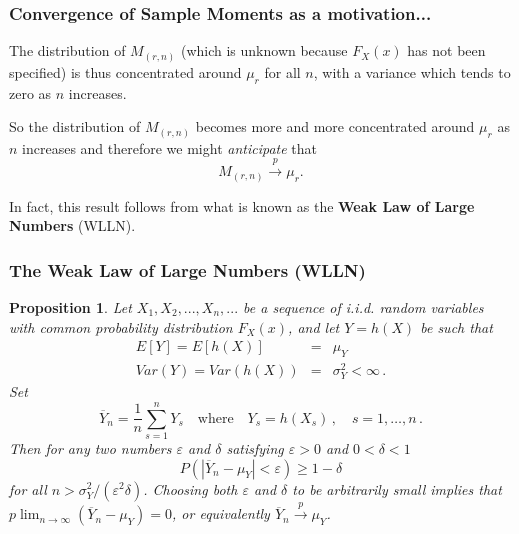\documentclass[notes=show,smaller,handout]{beamer}\usepackage[]{graphicx}\usepackage[]{color}
\newtheorem{proposition}{Proposition}[section]
\renewcommand{\Pr}{P}
\begin{document}
\begin{frame}%

\frametitle{Convergence of Sample Moments as a motivation...}

The distribution of $M_{(r,n)}$ (which is unknown because $F_X(x)$ has not been specified) is thus concentrated around $\mu_r $ for all $n$,
with a variance which tends to zero as $n$ increases. \\ \vspace{0.4cm}

So the distribution of $M_{(r,n)}$ becomes more and more concentrated around $\mu_r$ as $n
$ increases and therefore we might \color{blue}\emph{anticipate }\color{black} that
\begin{equation*}
M_{(r,n)}\overset{p}{\rightarrow }\mu_r.
\end{equation*}

\vspace{0.3cm}
In fact, this result follows from what is known as the \textbf{Weak Law of Large Numbers} (WLLN).
\end{frame}%

\begin{frame}%

\frametitle{The Weak Law of Large Numbers (WLLN)}

\begin{proposition}
 Let $X_{1},X_{2},...,X_{n},...$ be a sequence of \textit{i.i.d.} random variables with common probability distribution $F_X(x)$, and let $Y=h(X)$ be such that
\begin{eqnarray*}
E[Y]=E\left[ h(X)\right]  &=&\mu_Y  \\
Var(Y)=Var\left( h(X)\right)  &=&\sigma_Y ^{2}<\infty\,.
\end{eqnarray*}%
Set
$$
\overline{Y}_n=\frac{1}{n}\sum_{s=1}^nY_s\quad\text{where}\quad Y_s=h(X_s)\,,\quad s=1,\ldots,n\,.
$$
Then for any two numbers $\varepsilon$ and $\delta$ satisfying $\varepsilon>0$ and $0<\delta<1$
$$
\Pr \left( \left\vert \overline{Y}_{n}-\mu_Y \right\vert<\varepsilon \right)\geq 1-\delta
$$
for all $n>\sigma_Y^2/(\varepsilon^2\delta)$. Choosing both $\varepsilon$ and $\delta$ to be arbitrarily small implies that $p\lim_{n\rightarrow\infty}(\overline{Y}_{n}-\mu_Y)=0$, or equivalently
$\overline{Y}_{n}\overset{p}{\rightarrow }\mu_Y$.
\end{proposition}

\end{frame}%
\end{document}
